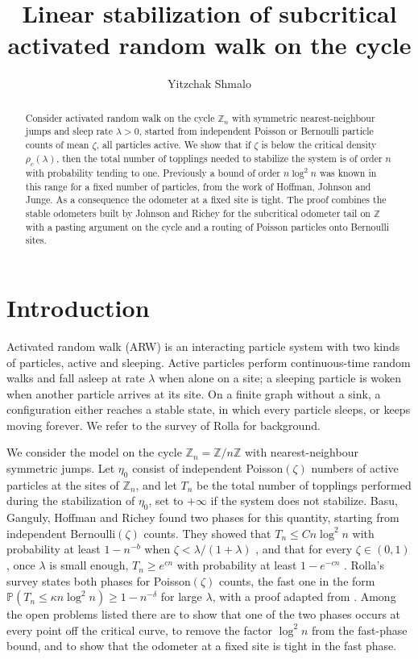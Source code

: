 \documentclass[11pt]{amsart}
\title{Linear stabilization of subcritical activated random walk on the cycle}
\author{Yitzchak Shmalo}
\date{}
\theoremstyle{remark}
\newcommand{\Z}{\mathbb Z}
\renewcommand{\Pr}{\mathbb P}
\begin{document}
\begin{abstract}
Consider activated random walk on the cycle $\Z_n$ with symmetric nearest-neighbour jumps and sleep rate $\lambda>0$,
started from independent Poisson or Bernoulli particle counts of mean $\zeta$, all particles active. We show that if
$\zeta$ is below the critical density $\rho_c(\lambda)$, then the total number of topplings needed to stabilize the
system is of order $n$ with probability tending to one. Previously a bound of order $n\log^2 n$ was known in this range for a
fixed number of particles, from the work of Hoffman, Johnson and Junge. As a consequence the
odometer at a fixed site is tight. The proof combines the stable odometers built by
Johnson and Richey for the subcritical odometer tail on $\Z$ with a pasting argument on the cycle and a routing of
Poisson particles onto Bernoulli sites.
\end{abstract}

\maketitle

\section{Introduction}\label{sec:intro}

Activated random walk (ARW) is an interacting particle system with two kinds of particles, active and sleeping. Active
particles perform continuous-time random walks and fall asleep at rate $\lambda$ when alone on a site; a sleeping
particle is woken when another particle arrives at its site. On a finite graph without a sink, a configuration either
reaches a stable state, in which every particle sleeps, or keeps moving forever. We refer to the survey of Rolla
\cite{Rolla} for background.

We consider the model on the cycle $\Z_n=\Z/n\Z$ with nearest-neighbour symmetric jumps. Let $\eta_0$ consist of
independent Poisson$(\zeta)$ numbers of active particles at the sites of $\Z_n$, and let $T_n$ be the total number of
topplings performed during the stabilization of $\eta_0$, set to $+\infty$ if the system does not stabilize. Basu,
Ganguly, Hoffman and Richey \cite{BGHR} found two phases for this quantity, starting from independent Bernoulli$(\zeta)$
counts. They showed that $T_n\le Cn\log^2 n$ with probability at least $1-n^{-b}$ when $\zeta<\lambda/(1+\lambda)$
\cite[Theorem~1]{BGHR}, and that for every $\zeta\in(0,1)$, once $\lambda$ is small enough, $T_n\ge e^{cn}$ with
probability at least $1-e^{-cn}$ \cite[Theorem~2]{BGHR}. Rolla's survey \cite[Theorem~6.1]{Rolla} states both phases for
Poisson$(\zeta)$ counts, the fast one in the form $\Pr(T_n\le\kappa n\log^2 n)\ge 1-n^{-\delta}$ for large $\lambda$, with
a proof adapted from \cite{BGHR}. Among the open problems listed there are to show that one of the two phases occurs at
every point off the critical curve, to remove the factor $\log^2 n$ from the fast-phase bound, and to show that the
odometer at a fixed site is tight in the fast phase.
\end{document}
